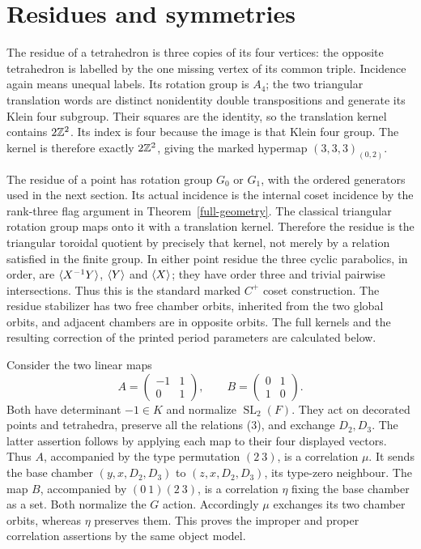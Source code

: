 \section{Residues and symmetries}

The residue of a tetrahedron is three copies of its four vertices:
the opposite tetrahedron is labelled by the one missing vertex
of its common triple. Incidence again means unequal labels.
Its rotation group is $A_4$; the two triangular translation words
are distinct nonidentity double transpositions and generate its
Klein four subgroup. Their squares are the identity, so the
translation kernel contains $2\mathbb Z^2$. Its index is four because
the image is that Klein four group. The kernel is therefore
exactly $2\mathbb Z^2$, giving the marked hypermap $(3,3,3)_{(0,2)}$.

The residue of a point has rotation group $G_0$ or $G_1$, with
the ordered generators used in the next section. Its actual
incidence is the internal coset incidence by the rank-three flag
argument in Theorem~\ref{full-geometry}. The classical triangular
rotation group maps onto it with a translation kernel. Therefore
the residue is the triangular toroidal quotient by precisely that
kernel, not merely by a relation satisfied in the finite group.
In either point residue the three cyclic parabolics, in order,
are $\langle X^{-1}Y\rangle$, $\langle Y\rangle$ and $\langle X\rangle$; they have order
three and trivial pairwise intersections. Thus this is the
standard marked $C^+$ coset construction. The residue stabilizer
has two free chamber orbits, inherited from the two global orbits,
and adjacent chambers are in opposite orbits.
The full kernels and the resulting correction of the printed
period parameters are calculated below.

Consider the two linear maps
\[
       A=\begin{pmatrix}-1&1\\0&1\end{pmatrix},\qquad
       B=\begin{pmatrix}0&1\\1&0\end{pmatrix}.
\]
Both have determinant $-1\in K$ and normalize $\operatorname{SL}_2(F)$.
They act on decorated points and tetrahedra, preserve all the
relations (3), and exchange $D_2,D_3$. The latter assertion
follows by applying each map to their four displayed vectors.
Thus $A$, accompanied by the type permutation $(2\ 3)$, is a
correlation $\mu$. It sends the base chamber
$(y,x,D_2,D_3)$ to $(z,x,D_2,D_3)$, its type-zero neighbour.
The map $B$, accompanied by $(0\ 1)(2\ 3)$, is a correlation
$\eta$ fixing the base chamber as a set. Both normalize the
$G$ action. Accordingly $\mu$ exchanges its two chamber orbits,
whereas $\eta$ preserves them. This proves the improper and
proper correlation assertions by the same object model.

